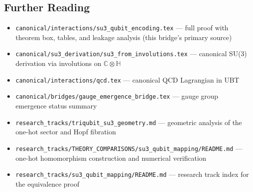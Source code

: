 \documentclass[11pt,a4paper]{article}
\newcommand{\C}{\mathbb{C}}
\newcommand{\H}{\mathbb{H}}
\begin{document}
\subsection{Further Reading}
\label{sec:bridges:su3_gauge_qubit:references}

\begin{itemize}
  \item \texttt{canonical/interactions/su3\_qubit\_encoding.tex} —
        full proof with theorem box, tables, and leakage analysis (this bridge's
        primary source)
  \item \texttt{canonical/su3\_derivation/su3\_from\_involutions.tex} —
        canonical SU(3) derivation via involutions on $\C\otimes\H$
  \item \texttt{canonical/interactions/qcd.tex} —
        canonical QCD Lagrangian in UBT
  \item \texttt{canonical/bridges/gauge\_emergence\_bridge.tex} —
        gauge group emergence status summary
  \item \texttt{research\_tracks/triqubit\_su3\_geometry.md} —
        geometric analysis of the one-hot sector and Hopf fibration
  \item \texttt{research\_tracks/THEORY\_COMPARISONS/su3\_qubit\_mapping/README.md} —
        one-hot homomorphism construction and numerical verification
  \item \texttt{research\_tracks/su3\_qubit\_mapping/README.md} —
        research track index for the equivalence proof
\end{itemize}


\ifdefined\INCLUDEMODE
\else
  
\end{document}
